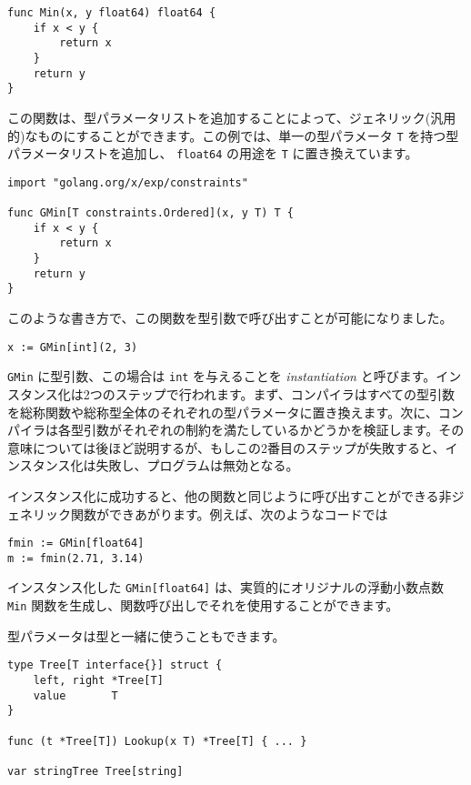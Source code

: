 \begin{lstlisting}[numbers=none]
func Min(x, y float64) float64 {
    if x < y {
        return x
    }
    return y
}
\end{lstlisting}

この関数は、型パラメータリストを追加することによって、ジェネリック(汎用的)なものにすることができます。この例では、単一の型パラメータ
\texttt{T} を持つ型パラメータリストを追加し、 \texttt{float64} の用途を
\texttt{T} に置き換えています。

\begin{lstlisting}[numbers=none]
import "golang.org/x/exp/constraints"

func GMin[T constraints.Ordered](x, y T) T {
    if x < y {
        return x
    }
    return y
}
\end{lstlisting}

このような書き方で、この関数を型引数で呼び出すことが可能になりました。

\begin{lstlisting}[numbers=none]
x := GMin[int](2, 3)
\end{lstlisting}

\texttt{GMin} に型引数、この場合は \texttt{int} を与えることを
\emph{instantiation}
と呼びます。インスタンス化は2つのステップで行われます。まず、コンパイラはすべての型引数を総称関数や総称型全体のそれぞれの型パラメータに置き換えます。次に、コンパイラは各型引数がそれぞれの制約を満たしているかどうかを検証します。その意味については後ほど説明するが、もしこの2番目のステップが失敗すると、インスタンス化は失敗し、プログラムは無効となる。

インスタンス化に成功すると、他の関数と同じように呼び出すことができる非ジェネリック関数ができあがります。例えば、次のようなコードでは

\begin{lstlisting}[numbers=none]
fmin := GMin[float64]
m := fmin(2.71, 3.14)
\end{lstlisting}

インスタンス化した \texttt{GMin{[}float64{]}}
は、実質的にオリジナルの浮動小数点数 \texttt{Min}
関数を生成し、関数呼び出しでそれを使用することができます。

型パラメータは型と一緒に使うこともできます。

\begin{lstlisting}[numbers=none]
type Tree[T interface{}] struct {
    left, right *Tree[T]
    value       T
}

func (t *Tree[T]) Lookup(x T) *Tree[T] { ... }

var stringTree Tree[string]
\end{lstlisting}

